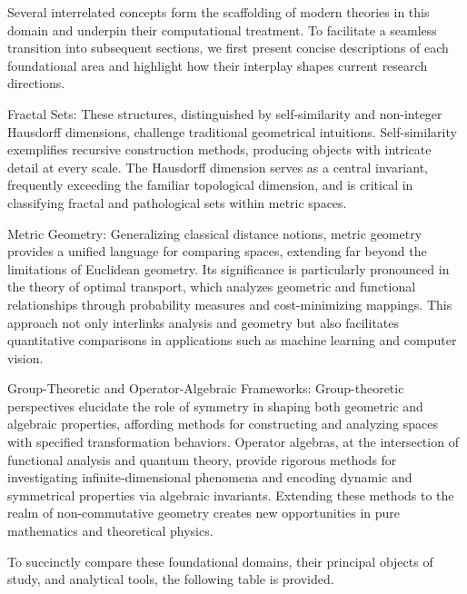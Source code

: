 \documentclass[sigconf]{acmart}
\begin{document}
Several interrelated concepts form the scaffolding of modern theories in this domain and underpin their computational treatment. To facilitate a seamless transition into subsequent sections, we first present concise descriptions of each foundational area and highlight how their interplay shapes current research directions.

Fractal Sets: These structures, distinguished by self-similarity and non-integer Hausdorff dimensions, challenge traditional geometrical intuitions. Self-similarity exemplifies recursive construction methods, producing objects with intricate detail at every scale. The Hausdorff dimension serves as a central invariant, frequently exceeding the familiar topological dimension, and is critical in classifying fractal and pathological sets within metric spaces.

Metric Geometry: Generalizing classical distance notions, metric geometry provides a unified language for comparing spaces, extending far beyond the limitations of Euclidean geometry. Its significance is particularly pronounced in the theory of optimal transport, which analyzes geometric and functional relationships through probability measures and cost-minimizing mappings. This approach not only interlinks analysis and geometry but also facilitates quantitative comparisons in applications such as machine learning and computer vision.

Group-Theoretic and Operator-Algebraic Frameworks: Group-theoretic perspectives elucidate the role of symmetry in shaping both geometric and algebraic properties, affording methods for constructing and analyzing spaces with specified transformation behaviors. Operator algebras, at the intersection of functional analysis and quantum theory, provide rigorous methods for investigating infinite-dimensional phenomena and encoding dynamic and symmetrical properties via algebraic invariants. Extending these methods to the realm of non-commutative geometry creates new opportunities in pure mathematics and theoretical physics.

To succinctly compare these foundational domains, their principal objects of study, and analytical tools, the following table is provided.
\end{document}
